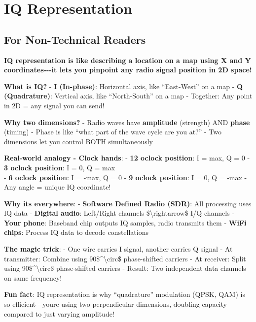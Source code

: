 \section{IQ Representation}\label{iq-representation}

\subsection{\texorpdfstring{ For Non-Technical
Readers}{ For Non-Technical Readers}}\label{for-non-technical-readers}

\textbf{IQ representation is like describing a location on a map using X
and Y coordinates-\/-\/-it lets you pinpoint any radio signal position
in 2D space!}

\textbf{What is IQ?} - \textbf{I (In-phase)}: Horizontal axis, like
``East-West'' on a map - \textbf{Q (Quadrature)}: Vertical axis, like
``North-South'' on a map - Together: Any point in 2D = any signal you
can send!

\textbf{Why two dimensions?} - Radio waves have \textbf{amplitude}
(strength) AND \textbf{phase} (timing) - Phase is like ``what part of
the wave cycle are you at?'' - Two dimensions let you control BOTH
simultaneously

\textbf{Real-world analogy - Clock hands}: - \textbf{12
o\textquotesingle clock position}: I = max, Q = 0 - \textbf{3
o\textquotesingle clock position}: I = 0, Q = max\\
- \textbf{6 o\textquotesingle clock position}: I = -max, Q = 0 -
\textbf{9 o\textquotesingle clock position}: I = 0, Q = -max - Any angle
= unique IQ coordinate!

\textbf{Why it\textquotesingle s everywhere}: - \textbf{Software Defined
Radio (SDR)}: All processing uses IQ data - \textbf{Digital audio}:
Left/Right channels \$\textbackslash rightarrow\$ I/Q channels -
\textbf{Your phone}: Baseband chip outputs IQ samples, radio transmits
them - \textbf{WiFi chips}: Process IQ data to decode constellations

\textbf{The magic trick}: - One wire carries I signal, another carries Q
signal - At transmitter: Combine using 90\$\^{}\textbackslash circ\$
phase-shifted carriers - At receiver: Split using
90\$\^{}\textbackslash circ\$ phase-shifted carriers - Result: Two
independent data channels on same frequency!

\textbf{Fun fact}: IQ representation is why ``quadrature'' modulation
(QPSK, QAM) is so efficient-\/-\/-you\textquotesingle re using two
perpendicular dimensions, doubling capacity compared to just varying
amplitude!


